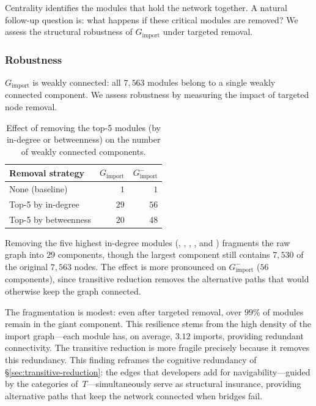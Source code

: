 Centrality identifies the modules that hold the network together. A natural follow-up question is: what happens if these critical modules are removed? We assess the structural robustness of $G_{\mathrm{import}}$ under targeted removal.

\subsubsection{Robustness}
\label{sec:robustness}

$G_{\mathrm{import}}$ is weakly connected: all $7{,}563$ modules belong to a single weakly connected component. We assess robustness by measuring the impact of targeted node removal.

\begin{table}[H]
\centering
\caption{Effect of removing the top-5 modules (by in-degree or betweenness) on the number of weakly connected components.}
\label{tab:robustness}
\begin{tabular}{lrr}
\toprule
Removal strategy & \multicolumn{1}{c}{$G_{\mathrm{import}}$} & \multicolumn{1}{c}{$G_{\mathrm{import}}^{-}$} \\
\midrule
None (baseline)          & $1$  & $1$  \\
Top-5 by in-degree       & $29$ & $56$ \\
Top-5 by betweenness     & $20$ & $48$ \\
\bottomrule
\end{tabular}
\end{table}

Removing the five highest in-degree modules (, , , , and ) fragments the raw graph into $29$ components, though the largest component still contains $7{,}530$ of the original $7{,}563$ nodes. The effect is more pronounced on $G_{\mathrm{import}}^{-}$ ($56$ components), since transitive reduction removes the alternative paths that would otherwise keep the graph connected.

\begin{remark}
\label{rem:robustness}
The fragmentation is modest: even after targeted removal, over $99\%$ of modules remain in the giant component. This resilience stems from the high density of the import graph---each module has, on average, $3.12$ imports, providing redundant connectivity. The transitive reduction is more fragile precisely because it removes this redundancy.
This finding reframes the cognitive redundancy of \S\ref{sec:transitive-reduction}: the edges that developers add for navigability---guided by the categories of~$T$---simultaneously serve as structural insurance, providing alternative paths that keep the network connected when bridges fail.
\end{remark}

